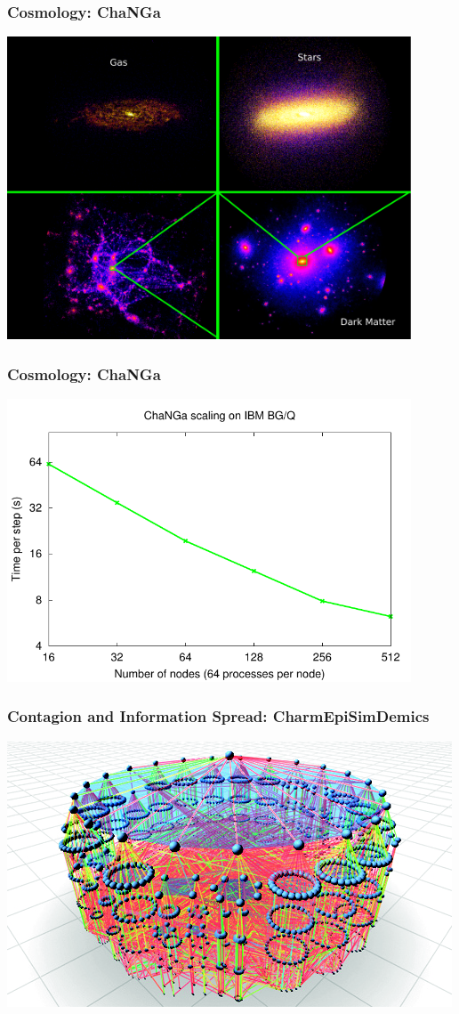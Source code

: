 \begin{frame}
\frametitle{Cosmology: ChaNGa}
\begin{center}
\includegraphics[width=0.9\textwidth]{../figures/changa-length-scales.pdf}
\end{center}
\end{frame}


\begin{frame}
\frametitle{Cosmology: ChaNGa}
\begin{center}
\includegraphics[width=0.9\textwidth]{../figures/changa-scaling.pdf}
\end{center}
\end{frame}


\begin{frame}
\frametitle{Contagion and Information Spread: CharmEpiSimDemics}
\includegraphics[width=\textwidth]{../figures/contagion.png}
\end{frame}


